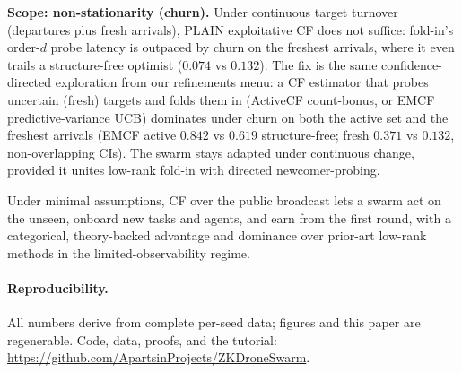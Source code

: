 \documentclass[11pt]{article}
\theoremstyle{plain}
\begin{document}
\textbf{Scope: non-stationarity (churn).} Under continuous target turnover (departures plus
fresh arrivals), PLAIN exploitative CF does not suffice: fold-in's order-$d$ probe latency is
outpaced by churn on the freshest arrivals, where it even trails a structure-free optimist
($0.074$ vs $0.132$). The fix is the same confidence-directed exploration from our refinements
menu: a CF estimator that probes uncertain (fresh) targets and folds them in (ActiveCF
count-bonus, or EMCF predictive-variance UCB) dominates under churn on both the active set and
the freshest arrivals (EMCF active $0.842$ vs $0.619$ structure-free; fresh $0.371$ vs $0.132$,
non-overlapping CIs). The swarm stays adapted under continuous change, provided it unites
low-rank fold-in with directed newcomer-probing.

Under minimal assumptions, CF over the public broadcast lets a swarm act on the unseen,
onboard new tasks and agents, and earn from the first round, with a categorical,
theory-backed advantage and dominance over prior-art low-rank methods in the
limited-observability regime.

\paragraph{Reproducibility.} All numbers derive from complete per-seed data; figures
and this paper are regenerable. Code, data, proofs, and the tutorial:
\url{https://github.com/ApartsinProjects/ZKDroneSwarm}.



\end{document}
